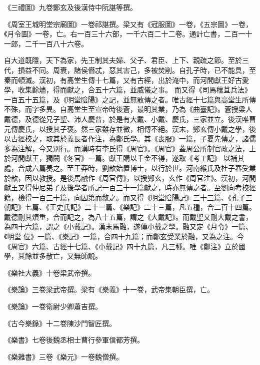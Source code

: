 \begin{pinyinscope}
 《三禮圖》九卷鄭玄及後漢侍中阮諶等撰。



 《周室王城明堂宗廟圖》一卷祁諶撰。梁又有《冠服圖》一卷，《五宗圖》一卷，《月令圖》一卷，亡。右一百三十六部，一千六百二十二卷。通計亡書，二百一十一郎，二千一百八十六卷。



 自大道既隱，天下為家，先王制其夫婦、父子、君臣、上下、親疏之節。至於三代，損益不同。周衰，諸侯僭忒，惡其害己，多被焚削。自孔子時，已不能具，至秦而頓滅。漢初，有高堂生傳十七篇，又有古經，出於淹中，而河間獻王好古愛學，收集餘燼，得而獻之，合五十六篇，並威儀之事。
 而又得《司馬穰苴兵法》一百五十五篇，及《明堂陰陽》之記，並無敢傳之者。唯古經十七篇與高堂生所傳不殊，而字多異。自高堂生至宣帝時後蒼，最明其業，乃為《曲臺記》。蒼授梁人戴德，及德從兄子聖、沛人慶普，於是有大戴、小戴、慶氏，三家並立。後漢唯曹元傳慶氏，以授其子褒。然三家雖存並微，相傳不絕。漢末，鄭玄傳小戴之學，後以古經校之，取其於義長者作注，為鄭氏學。其《喪服》一篇，子夏先傳之，諸儒多為注解，今又別行。而漢時有李氏得《周官》。《周官》蓋周公所制官政之法，上於河間獻王，獨闕《冬官》一篇。獻王購以千金不得，遂取《考工記》
 以補其處，合成六篇奏之。至王莽時，劉歆始置博士，以行於世。河南緱氏及杜子春受業於歆，因以教授。是後馬融作《周官傳》，以授鄭玄，玄作《周官注》。漢初，河間獻王又得仲尼弟子及後學者所記一百三十一篇獻之，時亦無傳之者。至劉向考校經籍，檢得一百三十篇，向因第而敘之。而又得《明堂陰陽記》三十三篇、《孔子三朝記》七篇、《王史氏記》二十一篇、《樂記》二十三篇，凡五種，合二百十四篇。戴德刪其煩重，合而記之，為八十五篇，謂之《大戴記》。而戴聖又刪大戴之書，為四十六篇，謂之《小戴記》。漢末馬融，遂傳小戴之學。融又定《月令》一篇、《明堂
 位》一篇、《樂記》一篇，合四十九篇；而鄭玄受業於融，又為之注。今《周官》六篇、古經十七篇、《小戴記》四十九篇，凡三種。唯《鄭注》立於國學，其餘並多散亡，又無師說。



 《樂社大義》十卷梁武帝撰。



 《樂論》三卷梁武帝撰。梁有《樂義》十一卷，武帝集朝臣撰，亡。



 《樂論》一卷衛尉少卿蕭吉撰。



 《古今樂錄》十二卷陳沙門智匠撰。



 《樂書》七卷後魏丞相士曹行參軍信都芳撰。



 《樂雜書》三卷《樂元》一卷魏僧撰。




\end{pinyinscope}
